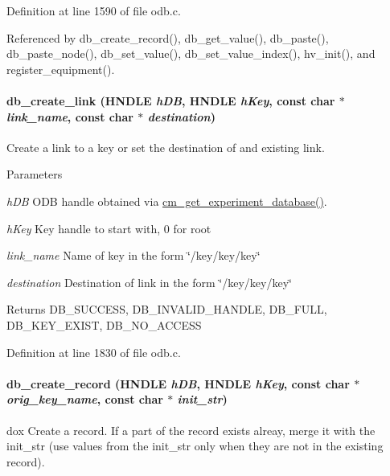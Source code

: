 Definition at line 1590 of file odb.c.

Referenced by db\_\-create\_\-record(), db\_\-get\_\-value(), db\_\-paste(), db\_\-paste\_\-node(), db\_\-set\_\-value(), db\_\-set\_\-value\_\-index(), hv\_\-init(), and register\_\-equipment().
\paragraph[{db\_\-create\_\-link}]{ db\_\-create\_\-link (HNDLE {\em hDB}, \/  HNDLE {\em hKey}, \/  const char $\ast$ {\em link\_\-name}, \/  const char $\ast$ {\em destination})}\hfill\label{group__odbfunctionc_ga3da25029b1835ef605483b91684704f6}
Create a link to a key or set the destination of and existing link. 
\begin{DoxyParams}{Parameters}
\item[{\em hDB}]ODB handle obtained via \hyperlink{group__cmfunctionc_ga16b33b70783a3f5ba98b4094149d12b7}{cm\_\-get\_\-experiment\_\-database()}. \item[{\em hKey}]Key handle to start with, 0 for root \item[{\em link\_\-name}]Name of key in the form \char`\"{}/key/key/key\char`\"{} \item[{\em destination}]Destination of link in the form \char`\"{}/key/key/key\char`\"{} \end{DoxyParams}
\begin{DoxyReturn}{Returns}
DB\_\-SUCCESS, DB\_\-INVALID\_\-HANDLE, DB\_\-FULL, DB\_\-KEY\_\-EXIST, DB\_\-NO\_\-ACCESS 
\end{DoxyReturn}


Definition at line 1830 of file odb.c.
\paragraph[{db\_\-create\_\-record}]{ db\_\-create\_\-record (HNDLE {\em hDB}, \/  HNDLE {\em hKey}, \/  const char $\ast$ {\em orig\_\-key\_\-name}, \/  const char $\ast$ {\em init\_\-str})}\hfill\label{group__odbfunctionc_ga59b971e77416b2b463e2e63f1b05342b}
dox Create a record. If a part of the record exists alreay, merge it with the init\_\-str (use values from the init\_\-str only when they are not in the existing record).


